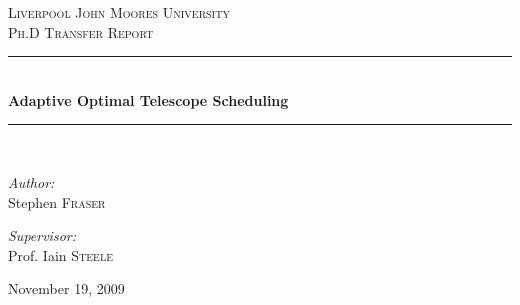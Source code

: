 \documentclass[12pt,a4paper]{article}
\newcommand{\HRule}{\rule{\linewidth}{0.5mm}}
\begin{document}
\setlength{\parindent}{5mm}
\setlength{\parskip}{10pt plus2mm minus2mm}
\thispagestyle{empty}




\begin{titlepage}
 
\begin{center}
 
 
\textsc{\LARGE Liverpool John Moores University}\\[1.5cm]
 
\textsc{\Large Ph.D Transfer Report}\\[0.5cm]
 
 
\HRule \\[0.4cm]
{ \Large \bfseries Adaptive Optimal Telescope Scheduling}\\[0.4cm]
 
\HRule \\[1.5cm]
 
\begin{minipage}{0.4\textwidth}
\begin{flushleft} \large
\emph{Author:}\\
Stephen \textsc{Fraser}
\end{flushleft}
\end{minipage}
\begin{minipage}{0.4\textwidth}
\begin{flushright} \large
\emph{Supervisor:} \\
Prof. Iain \textsc{Steele}
\end{flushright}
\end{minipage}
 
\vfill
 

{\large November 19, 2009}

 
\end{center}
 
\end{titlepage}


\newpage
\tableofcontents

\end{document}
